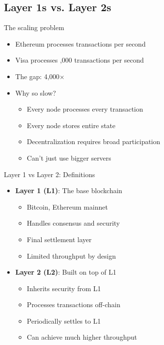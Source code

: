 \documentclass[aspectratio=169, lualatex, handout]{beamer}
\begin{document}
\subsection{Layer 1s vs. Layer 2s}

\begin{frame}{The scaling problem}
	\begin{itemize}
		\item Ethereum processes  transactions per second
		\item Visa processes ,000 transactions per second
		\item The gap: 4,000$\times$
		\item Why so slow?
		      \begin{itemize}
			      \item Every node processes every transaction
			      \item Every node stores entire state
			      \item Decentralization requires broad participation
			      \item Can't just use bigger servers
		      \end{itemize}
	\end{itemize}
\end{frame}

\begin{frame}{Layer 1 vs Layer 2: Definitions}
	\begin{itemize}
		\item \textbf{Layer 1 (L1)}: The base blockchain
		      \begin{itemize}
			      \item Bitcoin, Ethereum mainnet
			      \item Handles consensus and security
			      \item Final settlement layer
			      \item Limited throughput by design
		      \end{itemize}
		\item \textbf{Layer 2 (L2)}: Built on top of L1
		      \begin{itemize}
			      \item Inherits security from L1
			      \item Processes transactions off-chain
			      \item Periodically settles to L1
			      \item Can achieve much higher throughput
		      \end{itemize}
	\end{itemize}
\end{frame}
\end{document}
